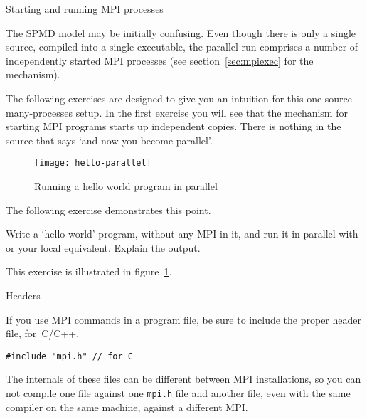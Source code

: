 
 {Starting and running MPI processes}
\label{sec:mpi-start}

The \ac{SPMD} model may be initially confusing. Even though there is
only a single source, compiled into a single executable,
the parallel run comprises a number of independently started MPI
processes (see section~\ref{sec:mpiexec} for the mechanism).

The following exercises are designed to give you an intuition for this
one-source-many-processes setup. In the first exercise you will see
that the mechanism for starting MPI programs starts up independent
copies. There is nothing in the source that says `and now you become parallel'.

\begin{figure}[ht]
  \texttt{[image: hello-parallel]}
  \caption{Running a hello world program in parallel}
  \label{fig:hello-parallel}
\end{figure}

The following exercise demonstrates this point.


\begin{exercise}
  \label{ex:hello1}
  Write a `hello world' program, without any MPI in it,
  and run it in parallel with  or your local equivalent. 
  Explain the output.

\end{exercise}

This exercise is illustrated in figure~\ref{fig:hello-parallel}.

 {Headers}

If you use MPI commands in a program file, be sure to include
the proper header file,  for~C/C++.
\begin{verbatim}
#include "mpi.h" // for C
\end{verbatim}
The internals of these files can be different between MPI
installations, so you can not compile one file against one \lstinline{mpi.h}
file and another file, even with the same compiler on the same machine,
against a different MPI.

